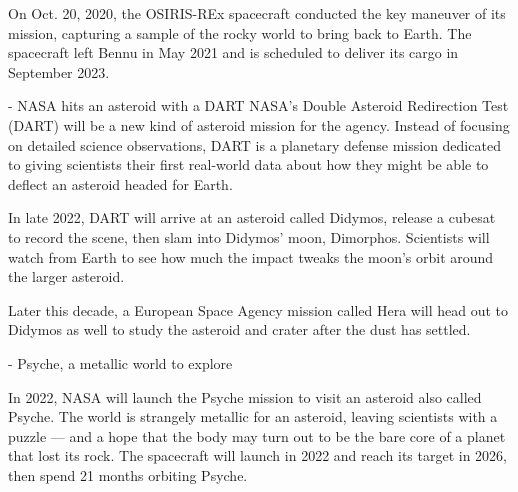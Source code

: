 On Oct. 20, 2020, the OSIRIS-REx spacecraft conducted the key maneuver of its
mission, capturing a sample of the rocky world to bring back to Earth. The
spacecraft left Bennu in May 2021 and is scheduled to deliver its cargo in
September 2023.



- NASA hits an asteroid with a DART
NASA's Double Asteroid Redirection Test (DART) will be a new kind of asteroid
mission for the agency. Instead of focusing on detailed science observations,
DART is a planetary defense mission dedicated to giving scientists their first
real-world data about how they might be able to deflect an asteroid headed for
Earth.

In late 2022, DART will arrive at an asteroid called Didymos, release a cubesat
to record the scene, then slam into Didymos' moon, Dimorphos. Scientists will
watch from Earth to see how much the impact tweaks the moon's orbit around the
larger asteroid.

Later this decade, a European Space Agency mission called Hera will head out to
Didymos as well to study the asteroid and crater after the dust has settled.


- Psyche, a metallic world to explore


In 2022, NASA will launch the Psyche mission to visit an asteroid also called
Psyche. The world is strangely metallic for an asteroid, leaving scientists with
a puzzle — and a hope that the body may turn out to be the bare core of a planet
that lost its rock. The spacecraft will launch in 2022 and reach its target
in 2026, then spend 21 months orbiting Psyche.